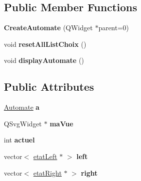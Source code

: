 \subsection*{Public Member Functions}
\begin{DoxyCompactItemize}
\item 
\hypertarget{class_create_automate_a564b1212466be9837975faf60f115862}{{\bfseries Create\-Automate} (Q\-Widget $\ast$parent=0)}\label{class_create_automate_a564b1212466be9837975faf60f115862}

\item 
\hypertarget{class_create_automate_a13c0f6c01986d1ef1173c84e7ff01768}{void {\bfseries reset\-All\-List\-Choix} ()}\label{class_create_automate_a13c0f6c01986d1ef1173c84e7ff01768}

\item 
\hypertarget{class_create_automate_ae3ab55bac630576c180865589a10c765}{void {\bfseries display\-Automate} ()}\label{class_create_automate_ae3ab55bac630576c180865589a10c765}

\end{DoxyCompactItemize}
\subsection*{Public Attributes}
\begin{DoxyCompactItemize}
\item 
\hypertarget{class_create_automate_a00809917dbe83828485789bf25725964}{\hyperlink{class_automate}{Automate} {\bfseries a}}\label{class_create_automate_a00809917dbe83828485789bf25725964}

\item 
\hypertarget{class_create_automate_a67da1a6995daa455a00771c099358a89}{Q\-Svg\-Widget $\ast$ {\bfseries ma\-Vue}}\label{class_create_automate_a67da1a6995daa455a00771c099358a89}

\item 
\hypertarget{class_create_automate_a599db4453047381fcd0d48dfb185da82}{int {\bfseries actuel}}\label{class_create_automate_a599db4453047381fcd0d48dfb185da82}

\item 
\hypertarget{class_create_automate_a368e5fd06e6bafb6a297cb7d32d90655}{vector$<$ \hyperlink{classetat_left}{etat\-Left} $\ast$ $>$ {\bfseries left}}\label{class_create_automate_a368e5fd06e6bafb6a297cb7d32d90655}

\item 
\hypertarget{class_create_automate_a8471078665ab7f4daf858c81f35496ac}{vector$<$ \hyperlink{classetat_right}{etat\-Right} $\ast$ $>$ {\bfseries right}}\label{class_create_automate_a8471078665ab7f4daf858c81f35496ac}

\end{DoxyCompactItemize}
